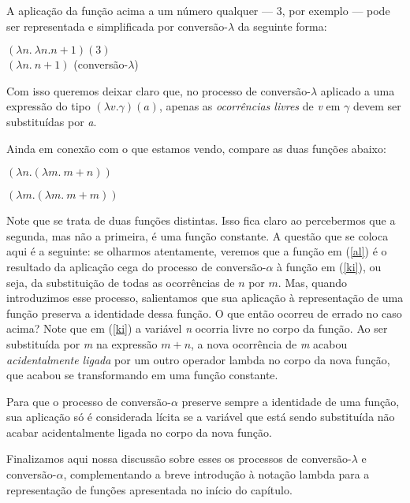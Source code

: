 A aplicação da função acima a um número qualquer --- 3, por
exemplo --- pode ser representada e simplificada por
conversão-$\lambda$ da
seguinte forma:

\begin{exe}
	\ex $(\lambda n.\ \lambda n. n+1)(3)$\\
	$(\lambda n.\ n+1)$ \hfill (conversão-$\lambda$)
\end{exe}


\n Com isso queremos deixar claro que, no processo de
conversão-$\lambda$ aplicado a uma expressão do tipo $(\lambda v.
\gamma)(a)$, apenas as \textit{ocorrências livres} de
\textit{v} em $\gamma$ devem ser substituídas por \textit{a}.

Ainda em conexão com o que estamos vendo, compare as duas
funções abaixo:

\begin{exe}
	\ex $(\lambda n.(\lambda m.\ m+n))$ \label{ki}
\end{exe}

\begin{exe}
	\ex $(\lambda m.(\lambda m.\ m+m))$ \label{al}
\end{exe}


\n Note que se trata de duas funções distintas. Isso fica
claro ao percebermos que a segunda, mas não a primeira, é uma
função constante. A questão que se coloca aqui é a seguinte: se
olharmos atentamente, veremos que a função em (\ref{al}) é o
resultado da aplicação cega do processo de conversão-$\alpha$ à
função em (\ref{ki}), ou seja, da substituição de todas as ocorrências de $n$ por $m$. Mas, quando introduzimos esse processo,
salientamos que sua aplicação à representação de uma função
preserva a identidade dessa função. O que então ocorreu de
errado no caso acima? Note que em (\ref{ki}) a variável \textit{n}
ocorria livre no corpo da função. Ao ser substituída por
\textit{m} na expressão $m+n$, a nova ocorrência de
\textit{m} acabou \textit{acidentalmente ligada} por um outro
operador lambda no corpo da nova função, que acabou se
transformando em uma função constante.

Para que o processo de conversão-$\alpha$ preserve sempre a
identidade de uma função, sua aplicação só é considerada
lícita se a variável que está sendo substituída não acabar
acidentalmente ligada no corpo da nova função.

Finalizamos aqui nossa discussão sobre esses os processos de conversão-$\lambda$ e conversão-$\alpha$,
complementando a breve introdução à notação lambda para a representação de funções apresentada no início do capítulo.

